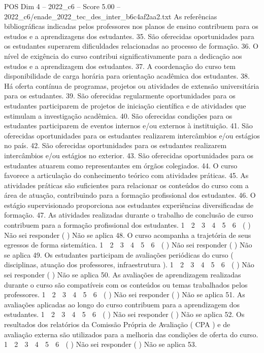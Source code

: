 \begin{textsample}{POS Dim 4 – 2022\_c6 – Score 5.00 – 2022\_c6/enade\_2022\_tec\_des\_inter\_b6c4af2aa2.txt}
As referências bibliográficas indicadas pelos professores nos planos de ensino contribuem para os estudos e a aprendizagens dos estudantes. 35.
São oferecidas oportunidades para os estudantes superarem dificuldades relacionadas ao processo de formação. 36.
O nível de exigência do curso contribui significativamente para a dedicação aos estudos e a aprendizagem dos estudantes. 37.
A coordenação do curso tem disponibilidade de carga horária para orientação acadêmica dos estudantes. 38.
Há oferta contínua de programas, projetos ou atividades de extensão universitária para os estudantes. 39.
São oferecidas regularmente oportunidades para os estudantes participarem de projetos de iniciação científica e de atividades que estimulam a investigação acadêmica. 40.
São oferecidas condições para os estudantes participarem de eventos internos e/ou externos à instituição. 41.
São oferecidas oportunidades para os estudantes realizarem intercâmbios e/ou estágios no país. 42.
São oferecidas oportunidades para os estudantes realizarem intercâmbios e/ou estágios no exterior. 43.
São oferecidas oportunidades para os estudantes atuarem como representantes em órgãos colegiados. 44.
O curso favorece a articulação do conhecimento teórico com atividades práticas. 45.
As atividades práticas são suficientes para relacionar os conteúdos do curso com a área de atuação, contribuindo para a formação profissional dos estudantes. 46.
O estágio supervisionado proporciona aos estudantes experiências diversificadas de formação. 47.
As atividades realizadas durante o trabalho de conclusão de curso contribuem para a formação profissional dos estudantes. 1 ⃝ 2 ⃝ 3 ⃝ 4 ⃝ 5 ⃝ 6 ⃝ ( ) Não sei responder ( ) Não se aplica 48.
O curso acompanha a trajetória de seus egressos de forma sistemática. 1 ⃝ 2 ⃝ 3 ⃝ 4 ⃝ 5 ⃝ 6 ⃝ ( ) Não sei responder ( ) Não se aplica 49.
Os estudantes participam de avaliações periódicas do curso ( disciplinas, atuação dos professores, infraestrutura ). 1 ⃝ 2 ⃝ 3 ⃝ 4 ⃝ 5 ⃝ 6 ⃝ ( ) Não sei responder ( ) Não se aplica 50.
As avaliações de aprendizagem realizadas durante o curso são compatíveis com os conteúdos ou temas trabalhados pelos professores. 1 ⃝ 2 ⃝ 3 ⃝ 4 ⃝ 5 ⃝ 6 ⃝ ( ) Não sei responder ( ) Não se aplica 51.
As avaliações aplicadas ao longo do curso contribuem para a aprendizagem dos estudantes. 1 ⃝ 2 ⃝ 3 ⃝ 4 ⃝ 5 ⃝ 6 ⃝ ( ) Não sei responder ( ) Não se aplica 52.
Os resultados dos relatórios da Comissão Própria de Avaliação ( CPA ) e de avaliação externa são utilizados para a melhoria das condições de oferta do curso. 1 ⃝ 2 ⃝ 3 ⃝ 4 ⃝ 5 ⃝ 6 ⃝ ( ) Não sei responder ( ) Não se aplica 53.

\end{textsample}
